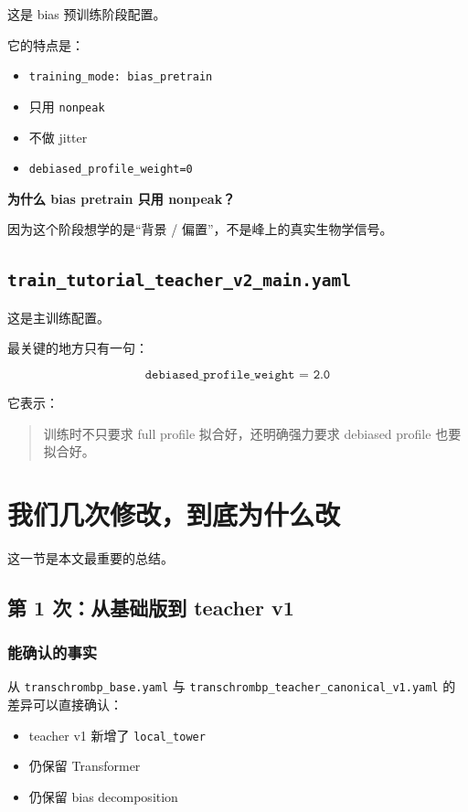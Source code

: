 \documentclass[11pt,a4paper]{ctexart}
\begin{document}
这是 bias 预训练阶段配置。

它的特点是：

\begin{itemize}[leftmargin=2em]
\item \texttt{training\_mode: bias\_pretrain}
\item 只用 \texttt{nonpeak}
\item 不做 jitter
\item \texttt{debiased\_profile\_weight=0}
\end{itemize}

\textbf{为什么 bias pretrain 只用 nonpeak？}

因为这个阶段想学的是“背景 / 偏置”，不是峰上的真实生物学信号。

\subsection{\texttt{train\_tutorial\_teacher\_v2\_main.yaml}}

这是主训练配置。

最关键的地方只有一句：

\[
\texttt{debiased\_profile\_weight = 2.0}
\]

它表示：

\begin{quote}
训练时不只要求 full profile 拟合好，还明确强力要求 debiased profile 也要拟合好。
\end{quote}

\section{我们几次修改，到底为什么改}

这一节是本文最重要的总结。

\subsection{第 1 次：从基础版到 teacher v1}

\subsubsection*{能确认的事实}

从 \texttt{transchrombp\_base.yaml} 与
\texttt{transchrombp\_teacher\_canonical\_v1.yaml} 的差异可以直接确认：

\begin{itemize}[leftmargin=2em]
\item teacher v1 新增了 \texttt{local\_tower}
\item 仍保留 Transformer
\item 仍保留 bias decomposition
\end{itemize}
\end{document}
